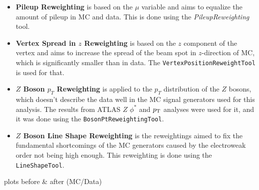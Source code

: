 \begin{itemize}
\item \textbf{Pileup Reweighting} is based on the $\mu$ variable and aims to equalize the amount of pileup in MC and data. This is done using the \textit{PileupReweighting} tool.
\item \textbf{Vertex Spread in $z$ Reweighting} is based on the $z$ component of the vertex and aims to increase the spread of the beam spot in $z$-direction of MC, which is significantly smaller than in data. The \texttt{VertexPositionReweightTool} is used for that.
\item \textbf{$Z$ Boson $p_T$ Reweighting} is applied to the $p_T$ distribution of the $Z$ bosons, which doesn't describe the data well in the MC signal generators used for this analysis. The results from ATLAS $Z$ $\phi^*$ and $p_{\mathrm{T}}$ analyses were used for it, and it was done using the \texttt{BosonPtReweightingTool}.
\item \textbf{$Z$ Boson Line Shape Reweighting} is the reweightings aimed to fix the fundamental shortcomings of the MC generators caused by the electroweak order not being high enough. This reweighting is done using the \texttt{LineShapeTool}.
\end{itemize}

plots before \& after (MC/Data) \tbu
